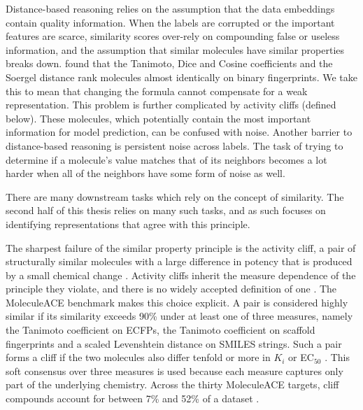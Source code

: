 Distance-based reasoning relies on the assumption that the data embeddings contain quality information. When the labels are corrupted or the important features are scarce, similarity scores over-rely on compounding false or useless information, and the assumption that similar molecules have similar properties breaks down. \citet{Bajusz2015} found that the Tanimoto, Dice and Cosine coefficients and the Soergel distance rank molecules almost identically on binary fingerprints. We take this to mean that changing the formula cannot compensate for a weak representation.
This problem is further complicated by activity cliffs (defined below). These molecules, which potentially contain the most important information for model prediction, can be confused with noise. Another barrier to distance-based reasoning is persistent noise across labels. The task of trying to determine if a molecule's value matches that of its neighbors becomes a lot harder when all of the neighbors have some form of noise as well.

There are many downstream tasks which rely on the concept of similarity. The second half of this thesis relies on many such tasks, and as such focuses on identifying representations that agree with this principle. 


The sharpest failure of the similar property principle is the activity cliff, a pair of structurally similar molecules with a large difference in potency that is produced by a small
chemical change \citep{Maggiora2006, Stumpfe2012}. Activity cliffs inherit the measure dependence of the principle they violate, and there is no widely accepted definition of one
\citep{vanTilborg2022}. The MoleculeACE benchmark \citep{vanTilborg2022} makes this choice explicit. A pair is considered highly similar if its similarity exceeds 90\% under at least one of
three measures, namely the Tanimoto coefficient on ECFPs, the Tanimoto coefficient on scaffold fingerprints and a scaled Levenshtein distance on SMILES strings. Such a pair forms a cliff if
the two molecules also differ tenfold or more in $K_i$ or EC$_{50}$ \citep{vanTilborg2022}. This soft consensus over three measures is used because each measure captures only part of the
underlying chemistry. Across the thirty MoleculeACE targets, cliff compounds account for between 7\% and 52\% of a dataset \citep{vanTilborg2022}.

